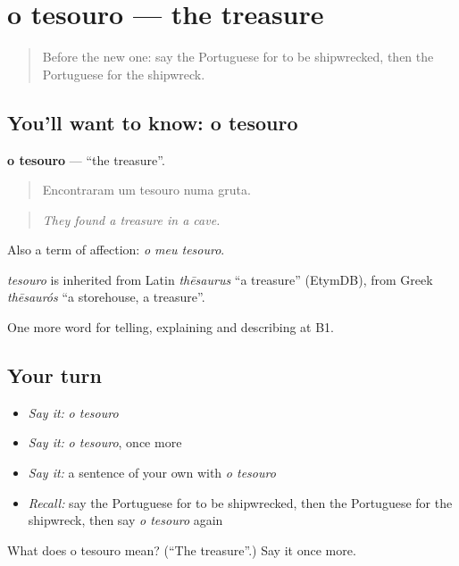 \section[o tesouro]{o tesouro — the treasure}

\label{lesson:PT-C328-tesouro}



\begin{quote}
Before the new one: say the Portuguese for to be shipwrecked, then the Portuguese for the shipwreck.
\end{quote}

\subsection*{You'll want to know: o tesouro}
\textbf{o tesouro} — \textquotedblleft{}the treasure\textquotedblright{}.

\begin{quote}
Encontraram um tesouro numa gruta.
\end{quote}

\begin{quote}
\emph{They found a treasure in a cave.}
\end{quote}

Also a term of affection: \emph{o meu tesouro}.

\begin{cousinweb}
\emph{tesouro} is inherited from Latin \emph{thēsaurus} \textquotedblleft{}a treasure\textquotedblright{} (EtymDB), from Greek \emph{thēsaurós} \textquotedblleft{}a storehouse, a treasure\textquotedblright{}.
\end{cousinweb}

\begin{grammarlens}[title={What you've built}]
One more word for telling, explaining and describing at B1.
\end{grammarlens}

\subsection*{Your turn}
\begin{itemize}
\raggedright
  \item \emph{Say it:} \emph{o tesouro}
  \item \emph{Say it:} \emph{o tesouro}, once more
  \item \emph{Say it:} a sentence of your own with \emph{o tesouro}
  \item \emph{Recall:} say the Portuguese for to be shipwrecked, then the Portuguese for the shipwreck, then say \emph{o tesouro} again
\end{itemize}

\begin{tcolorbox}[breakable,colback=teal!4,colframe=teal!35!black,title={Before you move on}]
What does o tesouro mean? (\textquotedblleft{}The treasure\textquotedblright{}.) Say it once more.
\end{tcolorbox}
